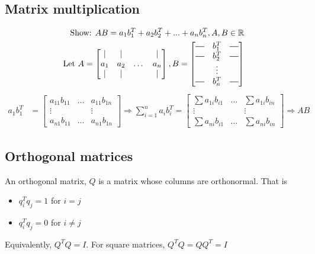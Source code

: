\documentclass{article}
\newcommand*{\horzbar}{\rule[.5ex]{2.5ex}{0.5pt}}
\begin{document}
\subsection{Matrix multiplication}
\begin{align*}
\textrm{Show: } AB = a_1b_1^T + a_2b_2^T + ... + a_nb_n^T, A,B \in \mathbb{R} \\
   \textrm{Let }
   A = \begin{bmatrix}
        \vert & \vert& & \vert \\
        a_1 & a_2 & \dots & a_n   \\
        \vert & \vert & & \vert \end{bmatrix}, 
    B = \begin{bmatrix}
        \horzbar & b_1^T & \horzbar \\
        \horzbar & b_2^T & \horzbar \\
         & \vdots &  \\ 
        \horzbar & b_n^T & \horzbar
    \end{bmatrix}
\end{align*}
\begin{align*}
    a_1b_1^T &= \begin{bmatrix}
        a_{11}b_{11} & \dots & a_{11}b_{1n} \\
        \vdots &  & \vdots \\
        a_{n1}b_{11} & \dots & a_{n1}b_{1n}
    \end{bmatrix} \Rightarrow
    \sum_{i=1}^{n} a_ib_i^T = \begin{bmatrix}
        \sum a_{1i}b_{i1} & \dots & \sum a_{1i}b_{in} \\
        \vdots &   & \vdots \\
        \sum a_{ni}b_{i1} &  \dots & \sum a_{ni}b_{in}
    \end{bmatrix} \Rightarrow AB
\end{align*}

\subsection{Orthogonal matrices}
An orthogonal matrix, $Q$ is a matrix whose columns are orthonormal. That is
\begin{itemize}
    \item $q_i^Tq_j = 1$ for $i=j$
    \item $q_i^Tq_j = 0$ for $i\neq j$
\end{itemize}
Equivalently, $Q^TQ = I$. For square matrices, $Q^TQ = QQ^T = I$
\end{document}
